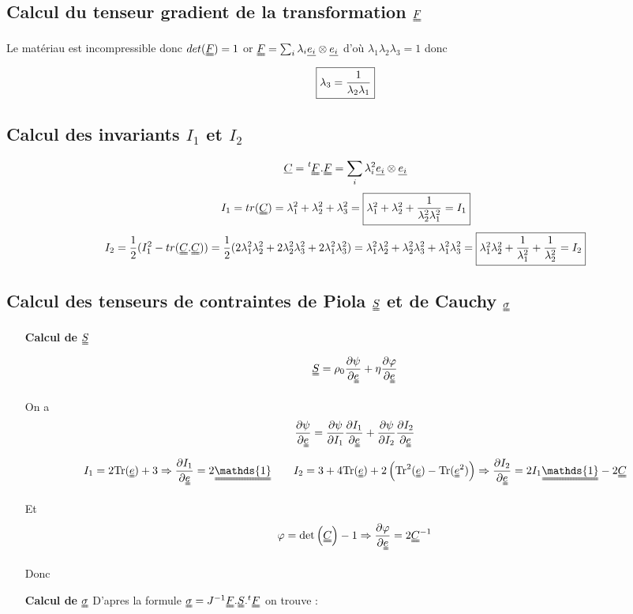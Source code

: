 \documentclass[a4paper,11pt]{article}
\newcommand{\trans}[1]{\tensor[^t]{#1}{}}
\newcommand{\tens}{\uuline}
\newcommand{\diage}[1]{\uline{e_{#1}} \otimes \uline{e_{#1}}}
\begin{document}
\subsection{Calcul du tenseur gradient de la transformation $\uuline{F}$}
Le matériau est incompressible donc $det(\uuline{F})=1$ or $\uuline{F}=\sum_{i} \lambda_i \uline{e_i}\otimes \uline{e_i}$ d'où $\lambda_1\lambda_2\lambda_3=1$ donc $$\fbox{$\lambda_3=\dfrac{1}{\lambda_2\lambda_1} $}$$

\subsection{Calcul des invariants $I_1$ et $I_2$}
$$\uline{C}= \trans{\tens{F}}.\uuline{F}=\sum_{i} \lambda_i ^2\diage{i}$$
$$I_1= tr(\uuline{C})=\lambda_1^2+\lambda_2^2+\lambda_3^2=\fbox{$\lambda_1^2+\lambda_2^2+\dfrac{1}{\lambda_2^2\lambda_1^2}=I_1$}$$
$$I_2=\frac{1}{2}(I_1^2 - tr(\uuline{C}.\uuline{C})) =\frac{1}{2}(2\lambda_1^2\lambda_2^2+2\lambda_2^2\lambda_3^2+2\lambda_1^2\lambda_3^2) =\lambda_1^2\lambda_2^2+\lambda_2^2\lambda_3^2+\lambda_1^2\lambda_3^2 =\fbox{$\lambda_1^2\lambda_2^2+\dfrac{1}{\lambda_1^2}+\dfrac{1}{\lambda_2^2}=I_2$}$$

\subsection{Calcul des tenseurs de contraintes de Piola $\uuline{S}$ et de Cauchy $\uuline{\sigma}$}
\begin{itemize}
	\item[\textbf{Calcul de} $\uuline{S}$] $$ \uuline{S} = \rho_0 \frac{\partial \psi}{\partial \uuline{e}} + \eta\frac{\partial \varphi}{\partial \uuline{e}} $$

	On a $$\frac{\partial \psi}{\partial \uuline{e}}= \frac{\partial \psi}{\partial I_1}\frac{\partial I_1}{\partial \uuline{e}}+\frac{\partial \psi}{\partial I_2}\frac{\partial I_2}{\partial \uuline{e}}$$
 $$I_1=2\text{Tr}(\uuline{e})+3\Rightarrow \frac{\partial I_1}{\partial \uuline{e}}= 2\uuline{\mathds{1}} \quad \quad I_2=3+4\text{Tr}(\uuline{e})+2\left(\text{Tr}^2(\uuline{e})-\text{Tr}(\uuline{e}^2)\right)
 \Rightarrow \frac{\partial I_2}{\partial \uuline{e}}= 2 I_1\uuline{\mathds{1}}-2\uuline{C}   $$

Et $$\varphi=\text{det}\left(\uuline{C}\right)-1 \Rightarrow  \frac{\partial \varphi}{\partial \uuline{e}}= 2\uuline{C}^{-1}$$

Donc 
	\item[\textbf{Calcul de} $\uuline{\sigma}$] D'apres la formule $\uuline{\sigma}=J^{-1}\uuline{F}.\uuline{S}.{}^t\uuline{F} $ on trouve :
	\\
\end{itemize}
\end{document}

